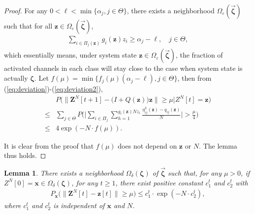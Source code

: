 \documentclass[11pt,twocolumn]{IEEEtran}
\newtheorem{lemma}{Lemma}
\begin{document}
\begin{proof}
For any $0<\ell< \min\{\alpha_j, j \in \Theta \}$, there exists a neighborhood $\Omega_{\varepsilon}(\vec{\bm \zeta})$ such that for all $\bm z \in \Omega_{\varepsilon}(\vec{\bm \zeta})$,
\begin{align}
\sum_{i \in \Pi_j(\bm z)} g_i(\bm z)z_i \geq \alpha_j-\ell, \quad j\in \Theta, \label{eq:deviation2}
\end{align}
which essentially means, under system state $\bm z \in \Omega_{\varepsilon}(\vec{\bm \zeta})$, the fraction of activated channels in each class will stay close to the case when system state is actually $\bm \zeta$. Let $f(\mu)=\min\{f_{j}(\mu)(\alpha_j-\ell), j\in \Theta \}$, then from (\ref{eq:deviation})-(\ref{eq:deviation2}),
\begin{align}
&P\Big( \big\| \bm Z^{N}[t+1]-\big(I+Q(\bm z)\big)\bm z \big\| \geq \mu \Big| Z^{N}[t]=\bm z \Big)\nonumber\\
\leq &\sum_{j\in \Theta} P\Big( \Big|\sum_{i \in \Pi_j}\sum_{h=1}^{g_i(\bm z)N z_i}  \frac{ \eta^h_{ij}(\bm z)-q_{ij}(\bm z)}{N}\Big| > \frac{\mu}{4} \Big) \nonumber \\
\leq& 4\exp(-N\cdot f(\mu)).\nonumber
\end{align}

It is clear from the proof that $f(\mu)$ does not depend on $\bm z$ or $N$. The lemma thus holds.
\end{proof}
\vspace{5pt}

\begin{lemma}
\label{lemma:onestep2}
There exists a neighborhood $\Omega_{\delta}(\bm \zeta)$ of $\vec{\bm \zeta}$ such that, for any $\mu>0$, if $Z^{N}[0]=\bm x \in \Omega_{\delta}(\bm \zeta)$, for any $t\geq 1$, there exist positive constant $c_1^t$ and $c_2^t$ with
\begin{align}
P_{\bm x}\Big( \big\| \bm Z^{N}[t]-\bm z[t] \big\| \geq \mu \Big)\leq c_1^t \cdot \exp(-N \cdot c_2^t), \nonumber
\end{align}
where $c_1^t$ and $c_2^t$ is independent of $\bm x$ and $N$.
\end{lemma}
\end{document}
